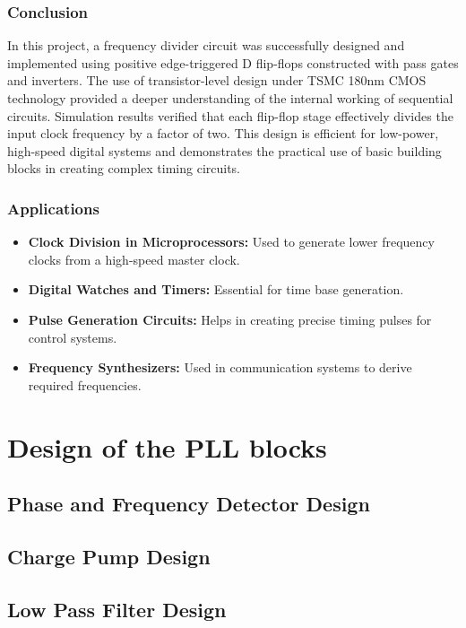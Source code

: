 \subsubsection*{Conclusion}
In this project, a frequency divider circuit was successfully designed and implemented using positive edge-triggered D flip-flops constructed with pass gates and inverters. The use of transistor-level design under TSMC 180nm CMOS technology provided a deeper understanding of the internal working of sequential circuits. Simulation results verified that each flip-flop stage effectively divides the input clock frequency by a factor of two. This design is efficient for low-power, high-speed digital systems and demonstrates the practical use of basic building blocks in creating complex timing circuits.

\subsubsection*{Applications}
\begin{itemize}
    \item \textbf{Clock Division in Microprocessors:} Used to generate lower frequency clocks from a high-speed master clock.
    \item \textbf{Digital Watches and Timers:} Essential for time base generation.
    \item \textbf{Pulse Generation Circuits:} Helps in creating precise timing pulses for control systems.
    \item \textbf{Frequency Synthesizers:} Used in communication systems to derive required frequencies.
\end{itemize}
\section{Design of the PLL blocks}
\subsection{Phase and Frequency Detector Design}
\subsection{Charge Pump Design}
\subsection{Low Pass Filter Design}
